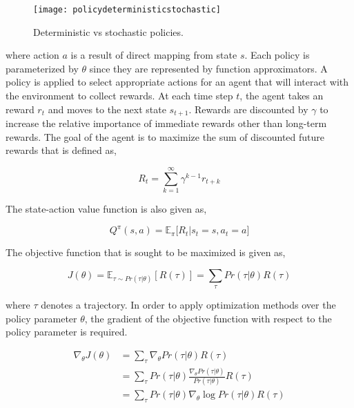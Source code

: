 \documentclass{ituphdreport}
\begin{document}
\begin{figure}[h]
	\begin{center}
		\texttt{[image: policydeterministicstochastic]}
	\end{center}
	\caption{Deterministic vs stochastic policies.
		\label{fig:policydeterministicstochastic}}
\end{figure}


where action $a$ is a result of direct mapping from state $s$. Each policy is parameterized by $\theta$ since they are represented by function approximators. A policy is applied to select appropriate actions for an agent that will interact with the environment to collect rewards. At each time step $t$, the agent takes an reward $r_t$ and moves to the next state $s_{t+1}$. Rewards are discounted by $\gamma$ to increase the relative importance of immediate rewards other than long-term rewards. The goal of the agent is to maximize the sum of discounted future rewards that is defined as,

\begin{equation}
\label{eq:abc}
R_t = \sum_{k=1}^{\infty}\gamma^{k-1}r_{t+k}
\end{equation}

The state-action value function is also given as,

\begin{equation}
\label{eq:abc}
Q^\pi(s,a) = \mathbb{E}_{\pi} \big[R_t|s_t = s, a_t = a\big]
\end{equation}

The objective function that is sought to be maximized is given as,

\begin{equation}
\label{eq:abc}
J(\theta) = \mathbb{E}_{\tau \sim Pr(\tau | \theta)} [R(\tau)] = \sum_{\tau} Pr(\tau | \theta) R(\tau)
\end{equation}

where $\tau$ denotes a trajectory. In order to apply optimization methods over the policy parameter $\theta$, the gradient of the objective function with respect to the policy parameter is required. 

\begin{align}
\label{eq:abc}
\nabla_\theta J(\theta)  &= \sum_{\tau} \nabla_\theta Pr(\tau | \theta) R(\tau) \\
						&= \sum_{\tau} Pr(\tau | \theta) \frac{\nabla_\theta Pr(\tau | \theta) }{Pr(\tau | \theta) } R(\tau) \\
						&= \sum_{\tau} Pr(\tau | \theta) \nabla_\theta \log Pr(\tau | \theta) R(\tau)
\end{align}
\end{document}
